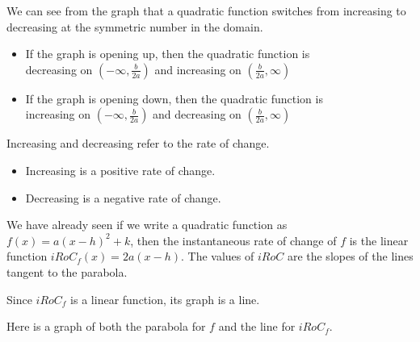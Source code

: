 \documentclass{ximera}
\begin{document}
We can see from the graph that a quadratic function switches from increasing to decreasing at the symmetric number in the domain.


\begin{itemize}
\item If the graph is opening up, then the quadratic function is \\

decreasing on $\left( -\infty, \frac{b}{2a} \right)$ and increasing on $\left( \frac{b}{2a}, \infty \right)$

\item If the graph is opening down, then the quadratic function is \\

increasing on $\left( -\infty, \frac{b}{2a} \right)$ and decreasing on $\left( \frac{b}{2a}, \infty \right)$
\end{itemize}





Increasing and decreasing refer to the rate of change.


\begin{itemize}
\item Increasing is a positive rate of change.
\item Decreasing is a negative rate of change.
\end{itemize}


We have already seen if we write a quadratic function as $f(x) = a (x - h)^2 + k$, then the instantaneous rate of change of $f$ is the linear function $iRoC_f(x) = 2 a (x - h)$. The values of $iRoC$ are the slopes of the lines tangent to the parabola.


Since $iRoC_f$ is a linear function, its graph is a line.


Here is a graph of both the parabola for $f$ and the line for $iRoC_f$.
\end{document}
